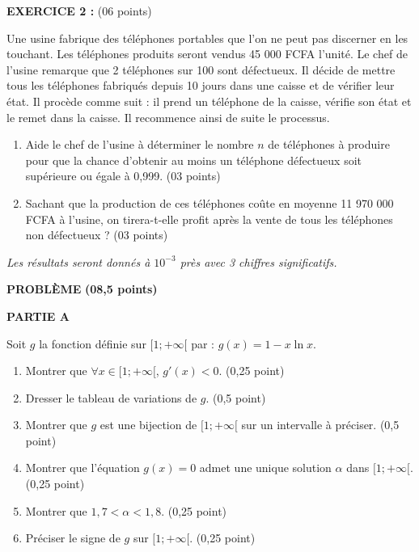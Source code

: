 \documentclass[11pt]{article}
\begin{document}
\vspace{0.5cm}
\noindent
\textbf{EXERCICE 2 :} \hfill (06 points)

\noindent
Une usine fabrique des téléphones portables que l’on ne peut pas discerner en les touchant. Les téléphones produits seront vendus 45 000 FCFA l’unité. Le chef de l’usine remarque que 2 téléphones sur 100 sont défectueux. Il décide de mettre tous les téléphones fabriqués depuis 10 jours dans une caisse et de vérifier leur état. Il procède comme suit : il prend un téléphone de la caisse, vérifie son état et le remet dans la caisse. Il recommence ainsi de suite le processus.

\begin{enumerate}
    \item Aide le chef de l’usine à déterminer le nombre \( n \) de téléphones à produire pour que la chance d’obtenir au moins un téléphone défectueux soit supérieure ou égale à 0,999. \hfill (03 points)
    
    \item Sachant que la production de ces téléphones coûte en moyenne 11 970 000 FCFA à l’usine, on tirera-t-elle profit après la vente de tous les téléphones non défectueux ? \hfill (03 points)
\end{enumerate}

\vspace{0.4cm}
\noindent
\textit{Les résultats seront donnés à \( 10^{-3} \) près avec 3 chiffres significatifs.}

\begin{center}
    \vspace{0.2cm}
    \textbf{PROBLÈME} \hfill \textbf{(08,5 points)}
\end{center}

\vspace{0.4cm}
\noindent
\textbf{PARTIE A}

\noindent
Soit \( g \) la fonction définie sur \( [1; +\infty[ \) par : \( g(x) = 1 - x \ln x \).

\begin{enumerate}
    \item Montrer que \( \forall x \in [1; +\infty[ \), \( g'(x) < 0 \). \hfill (0,25 point)
    \item Dresser le tableau de variations de \( g \). \hfill (0,5 point)
    \item Montrer que \( g \) est une bijection de \( [1; +\infty[ \) sur un intervalle à préciser. \hfill (0,5 point)
    \item Montrer que l’équation \( g(x) = 0 \) admet une unique solution \( \alpha \) dans \( [1; +\infty[ \). \hfill (0,25 point)
    \item Montrer que \( 1{,}7 < \alpha < 1{,}8 \). \hfill (0,25 point)
    \item Préciser le signe de \( g \) sur \( [1; +\infty[ \). \hfill (0,25 point)
\end{enumerate}
\end{document}
